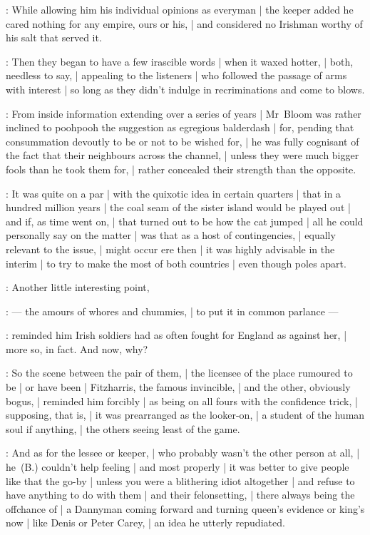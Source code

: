 :
While allowing him his individual opinions as everyman |
the keeper added he cared nothing for any empire, ours or his, |
and considered no Irishman worthy of his salt that served it.

:
Then they began to have a few irascible words |
when it waxed hotter, |
both, needless to say, |
appealing to the listeners |
who followed the passage of arms with interest |
so long as they didn't indulge in recriminations and come to blows.

:
From inside information extending over a series of years |
Mr~Bloom was rather inclined to poohpooh the suggestion as egregious balderdash |
for, pending that consummation devoutly to be or not to be wished for, |
he was fully cognisant of the fact that their neighbours across the channel, |
unless they were much bigger fools than he took them for, |
rather concealed their strength than the opposite.

:
It was quite on a par |
with the quixotic idea in certain quarters |
that in a hundred million years |
the coal seam of the sister island would be played out |
and if, as time went on, |
that turned out to be how the cat jumped |
all he could personally say on the matter |
was that as a host of contingencies, |
equally relevant to the issue, |
might occur ere then |
it was highly advisable in the interim |
to try to make the most of both countries |
even though poles apart.

:
Another little interesting point,

:
    --- the amours of whores and chummies, |
        to put it in common parlance ---

:
reminded him Irish soldiers had as often fought for England as against her, |
more so, in fact.
And now, why?

:
So the scene between the pair of them, |
the licensee of the place rumoured to be |
or have been |
Fitzharris, the famous invincible, |
and the other, obviously bogus, |
reminded him forcibly |
as being on all fours with the confidence trick, |
supposing, that is, |
it was prearranged as the looker-on, |
a student of the human soul if anything, |
the others seeing least of the game.

:
And as for the lessee or keeper, |
who probably wasn't the other person at all, |
he~(B.) couldn't help feeling |
and most properly |
it was better to give people like that the go-by |
unless you were a blithering idiot altogether |
and refuse to have anything to do with them |
and their felonsetting, |
there always being the offchance of |
a Dannyman coming forward and turning queen's evidence or king's now |
like Denis or Peter Carey, |
an idea he utterly repudiated.

